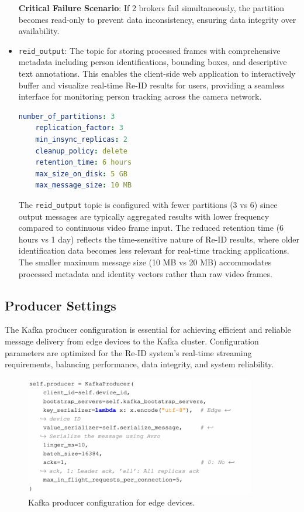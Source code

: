\begin{itemize}
    \textbf{Critical Failure Scenario}: If 2 brokers fail simultaneously, the partition becomes read-only to prevent data inconsistency, ensuring data integrity over availability.
    
    \item \texttt{reid\_output}: The topic for storing processed frames with comprehensive metadata including person identifications, bounding boxes, and descriptive text annotations. This enables the client-side web application to interactively buffer and visualize real-time Re-ID results for users, providing a seamless interface for monitoring person tracking across the camera network.
    
    \begin{lstlisting}[language=yaml]
    number_of_partitions: 3
    replication_factor: 3
    min_insync_replicas: 2
    cleanup_policy: delete
    retention_time: 6 hours
    max_size_on_disk: 5 GB
    max_message_size: 10 MB
    \end{lstlisting}
    
    The \texttt{reid\_output} topic is configured with fewer partitions (3 vs 6) since output messages are typically aggregated results with lower frequency compared to continuous video frame input. The reduced retention time (6 hours vs 1 day) reflects the time-sensitive nature of Re-ID results, where older identification data becomes less relevant for real-time tracking applications. The smaller maximum message size (10 MB vs 20 MB) accommodates processed metadata and identity vectors rather than raw video frames.
\end{itemize}

\subsection{Producer Settings}

The Kafka producer configuration is essential for achieving efficient and reliable message delivery from edge devices to the Kafka cluster. Configuration parameters are optimized for the Re-ID system's real-time streaming requirements, balancing performance, data integrity, and system reliability.

\begin{figure}[htbp]
    \centering
    \includegraphics[width=0.9\textwidth]{Figure/producer_conf.png}
    \caption{Kafka producer configuration for edge devices.}
    \label{fig:producer_config}
\end{figure}


